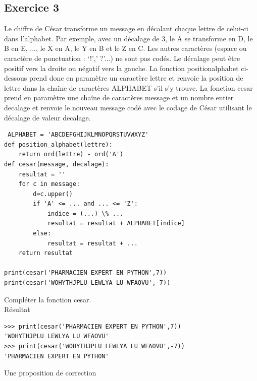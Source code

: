 \documentclass[a4paper,12pt]{article}
\begin{document}
\subsection{Exercice 3}
\begin{leftbar}
Le chiffre de C\'esar transforme un message en d\'ecalant chaque lettre de celui-ci dans l’alphabet.
Par exemple, avec un décalage de 3, le A se transforme en D, le B en E, ..., le X en A, le Y en B et le Z en C. Les autres caractères (espace ou caract\`ere de ponctuation : ‘!’,’ ?’...) ne sont pas codés. Le d\'ecalage peut \^etre positif vers la droite ou n\'egatif vers la gauche.
La fonction positionalphabet ci-dessous prend donc en param\`etre un caract\`ere lettre et renvoie la position de lettre dans la chaîne de caract\`eres ALPHABET s’il s’y trouve.
La fonction cesar prend en param\`etre une chaîne de caract\`eres message et un nombre entier decalage et renvoie le nouveau message cod\'e avec le codage de C\'esar utilisant le d\'ecalage de valeur decalage.
\begin{verbatim}
 ALPHABET = 'ABCDEFGHIJKLMNOPQRSTUVWXYZ'
def position_alphabet(lettre):
    return ord(lettre) - ord('A')
def cesar(message, decalage):
    resultat = ''
    for c in message:
        d=c.upper()
        if 'A' <= ... and ... <= 'Z':
            indice = (...) \% ...
            resultat = resultat + ALPHABET[indice]
        else:
            resultat = resultat + ...
    return resultat

print(cesar('PHARMACIEN EXPERT EN PYTHON',7))
print(cesar('WOHYTHJPLU LEWLYA LU WFAOVU',-7))
\end{verbatim}    
Compléter la fonction cesar.
\\
R\'esultat
\begin{verbatim}
>>> print(cesar('PHARMACIEN EXPERT EN PYTHON',7))
'WOHYTHJPLU LEWLYA LU WFAOVU'
>>> print(cesar('WOHYTHJPLU LEWLYA LU WFAOVU',-7))
'PHARMACIEN EXPERT EN PYTHON'
\end{verbatim}
\end{leftbar}

Une proposition de correction



\clearpage
\end{document}
